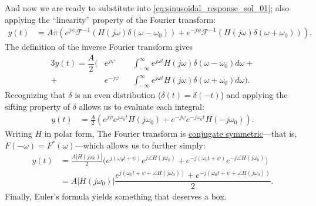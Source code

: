 \documentclass[dynamic_systems.tex]{subfiles}
\begin{document}
And now we are ready to substitute into \cref{eq:sinusoidal_response_sol_01}; also applying the ``linearity'' property of the Fourier transform:
\begin{align}
y(t) &= A \pi\left(
	e^{j\psi}
	\mathcal{F}^{-1}(
		H(j\omega) 
		\delta(\omega-\omega_0)
	) 
	+
	e^{-j\psi}
	\mathcal{F}^{-1}(
		H(j\omega) 
		\delta(\omega+\omega_0)
	)
\right).
\end{align}
The definition of the inverse Fourier transform gives
\begin{alignat}{3}
y(t) = \dfrac{A}{2}\Bigg(
	&e^{j\psi}
	&&\int_{-\infty}^\infty
		e^{j\omega t}
		H(j\omega) 
		\delta(\omega-\omega_0)
	d\omega
	{}+{} \nonumber \\
	{}+{}
	&e^{-j\psi}
	&&\int_{-\infty}^\infty
		e^{j\omega t}
		H(j\omega) 
		\delta(\omega+\omega_0)
	d\omega
\Bigg).
\end{alignat}
Recognizing that $\delta$ is an even distribution ($\delta(t) = \delta(-t)$) and applying the sifting property of $\delta$ allows us to evaluate each integral:
\begin{align}
	y(t) &= \frac{A}{2}
	\left(
		e^{j\psi} e^{j\omega_0 t} H(j\omega_0) +
		e^{-j\psi} e^{-j\omega_0 t} H(-j\omega_0)
	\right).
\end{align}
Writing $H$ in polar form,
The Fourier transform is \href{https://ocw.mit.edu/resources/res-6-007-signals-and-systems-spring-2011/lecture-notes/MITRES_6_007S11_lec09.pdf}{conjugate symmetric}---that is, $F(-\omega) = F^*(\omega)$---which allows us to further simply:
\begin{subequations}
\begin{align}
	y(t) &= \frac{A |H(j\omega_0)|}{2}
	\Big(
		e^{j(\omega_0 t + \psi)}  
		e^{j\angle H(j\omega_0)} 
		+
		e^{-j(\omega_0 t + \psi)} 
		e^{-j\angle H(j\omega_0)}
	\Big) \\
	&= A |H(j\omega_0)|
	\dfrac{
		e^{j(\omega_0 t + \psi + \angle H(j\omega_0))} 
		+
		e^{-j(\omega_0 t + \psi + \angle H(j\omega_0))}
	}{2}.
\end{align}
\end{subequations}
Finally, Euler's formula yields something that deserves a box.
\end{document}
